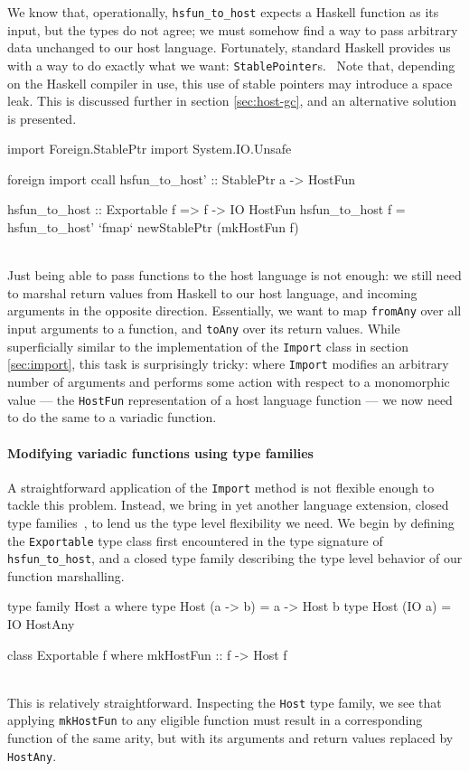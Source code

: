 \documentclass{sigplanconf}
\begin{document}
We know that, operationally, \lstinline!hsfun_to_host! expects a Haskell
function as its input, but the types do not agree; we must somehow find a way
to pass arbitrary data unchanged to our host language.
Fortunately, standard Haskell provides us with a way to do exactly what we want:
\lstinline!StablePointer!s.\ \cite{stableptr} Note that, depending on the
Haskell compiler in use, this use of stable pointers may introduce a space
leak. This is discussed further in section \ref{sec:host-gc}, and an
alternative solution is presented.\\
\begin{code}
  import Foreign.StablePtr
  import System.IO.Unsafe

  foreign import ccall
    hsfun_to_host' :: StablePtr a -> HostFun

  hsfun_to_host :: Exportable f => f -> IO HostFun
  hsfun_to_host f =
    hsfun_to_host' `fmap` newStablePtr (mkHostFun f)
\end{code}\\
Just being able to pass functions to the host language is not enough: we still
need to marshal return values from Haskell to our host language, and incoming
arguments in the opposite direction. Essentially, we want to map
\lstinline!fromAny! over all input arguments to a function, and
\lstinline!toAny! over its return values.
While superficially similar to the implementation of the \lstinline!Import!
class in section \ref{sec:import}, this task is surprisingly tricky:
where \lstinline!Import! modifies an arbitrary number of arguments and
performs some action with respect to a monomorphic value --- the
\lstinline!HostFun! representation of a host language function --- we now need
to do the same to a variadic function.

\paragraph{Modifying variadic functions using type families}
A straightforward application of the \lstinline!Import! method is not flexible
enough to tackle this problem. Instead, we bring in yet another language
extension, closed type families\ \cite{closedtypefamilies}, to lend us the type
level flexibility we need. We begin by defining the \lstinline!Exportable!
type class first encountered in the type signature of \lstinline!hsfun_to_host!,
and a closed type family describing the type level behavior of our function
marshalling.\\
\begin{code}
  type family Host a where
    type Host (a -> b) = a -> Host b
    type Host (IO a)   = IO HostAny

  class Exportable f where
    mkHostFun :: f -> Host f
\end{code}\\
This is relatively straightforward. Inspecting the \lstinline!Host! type
family, we see that applying \lstinline!mkHostFun! to any eligible function
must result in a corresponding function of the same arity, but with its
arguments and return values replaced by \lstinline!HostAny!.
\end{document}
